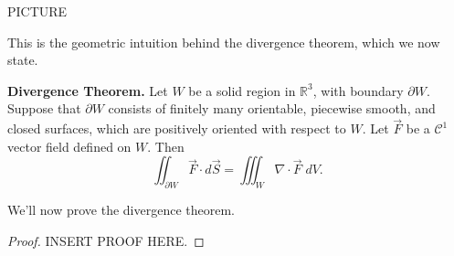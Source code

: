 \documentclass{ximera}
\begin{document}
PICTURE

This is the geometric intuition behind the divergence theorem, which we now state.

\begin{theorem}
\textbf{Divergence Theorem.} Let $W$ be a solid region in $\mathbb{R}^3$, with boundary $\partial W$. Suppose that $\partial W$ consists of finitely many orientable, piecewise smooth, and closed surfaces, which are positively oriented with respect to $W$. Let $\vec{F}$ be a $\mathcal{C}^1$ vector field defined on $W$. Then
\[
\iint_{\partial W} \vec{F}\cdot d\vec{S} = \iiint_W \nabla\cdot \vec{F}\;dV.
\]
\end{theorem}

We'll now prove the divergence theorem.

\begin{proof}
INSERT PROOF HERE.
\end{proof}
\end{document}
